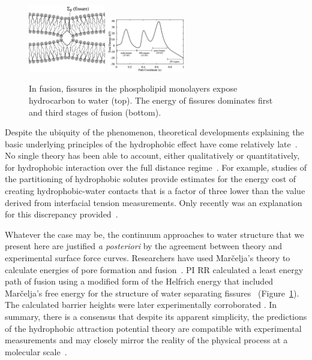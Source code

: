 \begin{figure}
  \vspace{-5pt}
\includegraphics[width=0.3\textwidth]{figures/Background/Fissure.jpg}
\includegraphics[width=0.3\textwidth]{figures/Background/Landscape.jpg}
\caption{\label{fig:fissure} In fusion, fissures in the phospholipid
  monolayers expose hydrocarbon to water (top). The energy of fissures
  dominates first and third stages of fusion (bottom).
}
\end{figure}
Despite the ubiquity of
the phenomenon, theoretical developments explaining the basic underlying
principles of the hydrophobic effect have come relatively
late~\cite{Ch05}.
No single theory has been able to account, either qualitatively
or quantitatively,
for hydrophobic interaction over the full distance
regime~\cite{Lum1999, Lin2005, Meyer2006, Ducker2016}.
For example, studies of the partitioning of
hydrophobic solutes provide estimates for the energy cost of creating
hydrophobic-water contacts
that is a factor of three lower than the value derived from interfacial
tension measurements. Only recently was an explanation for this
discrepancy provided~\cite{Jackson2016}.

Whatever the case may be, the continuum approaches to water structure
that we present here are justified
\textit{a posteriori} by the agreement between theory and experimental surface
force curves. Researchers have used Mar\v{c}elja's theory to calculate
energies of pore formation and fusion~\cite{Gletal88, Aketal17,
RyKlYaCo16}.
PI RR calculated a least energy path 
of fusion using a modified form of the Helfrich energy that
included Mar\v{c}elja's free energy for the structure of water
separating fissures~\cite{RyKlYaCo16} (Figure~\ref{fig:fissure}).
The calculated barrier heights were later experimentally
corroborated \cite{FrRoPi17}. In summary,
there is a consensus that despite its apparent simplicity, the predictions
of the hydrophobic attraction potential theory are compatible with
experimental measurements and may closely mirror the reality of
the physical process at a molecular scale~\cite{FrRoPi17, Fretal21}.


